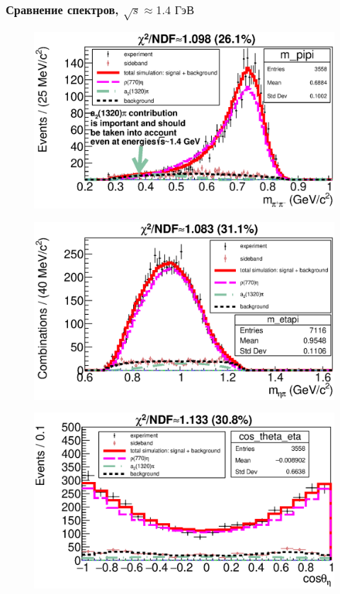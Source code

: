 \documentclass{beamer}
\begin{document}
\begin{frame}
  \frametitle{Сравнение спектров, $\sqrt{s}\approx{1.4}\text{ ГэВ}$}
  \begin{minipage}[t]{0.48\linewidth}
    \begin{figure}
      \includegraphics[width=\linewidth]{figures/m_pipi_g705.eps}
    \end{figure}
  \end{minipage}
  \begin{minipage}[t]{0.48\linewidth}
    \begin{figure}
      \includegraphics[width=\linewidth]{figures/m_etapi_g705.eps}
    \end{figure}
  \end{minipage}
  \begin{minipage}[t]{0.48\linewidth}
    \begin{figure}
      \includegraphics[width=\linewidth]{figures/cos_theta_eta_g705.eps}

\end{figure}
\end{minipage}
\end{frame}
\end{document}
